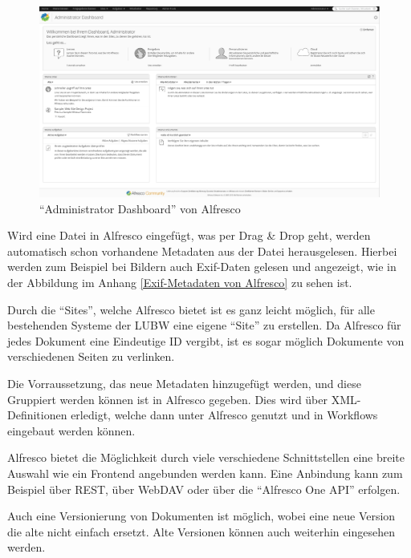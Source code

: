 \begin{figure}[!ht]
\centering
\includegraphics[width=16cm]{Bilder/Alfresco_Oberflaeche.jpg}
\caption{"`Administrator Dashboard"' von Alfresco}
\label{Alfresco Dashboard}
\centering
\end{figure}

Wird eine Datei in Alfresco eingef\"ugt, was per Drag \& Drop geht, werden automatisch schon vorhandene Metadaten aus der Datei herausgelesen. Hierbei werden zum Beispiel bei Bildern auch \ac{Exif}-Daten gelesen und angezeigt, wie in der Abbildung im Anhang \ref{Exif-Metadaten von Alfresco} zu sehen ist. 

Durch die "`Sites"', welche Alfresco bietet ist es ganz leicht m\"oglich, f\"ur alle bestehenden Systeme der \ac{LUBW} eine eigene "`Site"' zu erstellen. Da Alfresco f\"ur jedes Dokument eine Eindeutige ID vergibt, ist es sogar m\"oglich Dokumente von verschiedenen Seiten zu verlinken.
\cite{Eval_DMS_Bachelor}

Die Vorraussetzung, das neue Metadaten hinzugef\"ugt werden, und diese Gruppiert werden k\"onnen ist in Alfresco gegeben. Dies wird \"uber XML-Definitionen erledigt, welche dann unter Alfresco genutzt und in Workflows eingebaut werden k\"onnen. \cite{Alfresco_Custom_Content_Types} \cite{Professional_Alfresco}

Alfresco bietet die M\"oglichkeit durch viele verschiedene Schnittstellen eine breite Auswahl wie ein Frontend angebunden werden kann. Eine Anbindung kann zum Beispiel \"uber \ac{REST}, \"uber WebDAV oder \"uber die "`Alfresco One \ac{API}"' erfolgen. \cite{Alfrsco_Doku}

Auch eine Versionierung von Dokumenten ist m\"oglich, wobei eine neue Version die alte nicht einfach ersetzt. Alte Versionen k\"onnen auch weiterhin eingesehen werden.


